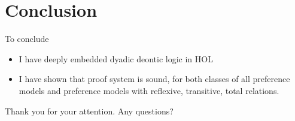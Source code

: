 \documentclass{beamer}
\begin{document}
\section{Conclusion}
\begin{frame}{To conclude}
	\begin{itemize}
	\item I have deeply embedded dyadic deontic logic in HOL
	\item I have shown that proof system is sound, for both classes of all preference models and preference models with reflexive, transitive, total relations.
	\end{itemize}
\end{frame}

\begin{frame}
\centering
Thank you for your attention. Any questions?
\end{frame}
\end{document}

